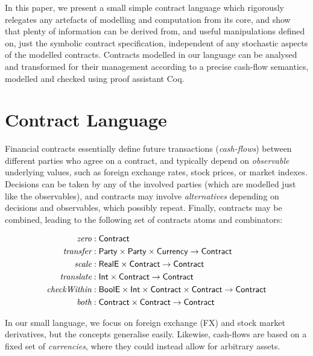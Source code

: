 \documentclass[a4paper,debug,twocolumn]{easychair}
\newcommand{\comm}[3][red]{{\small \color{#1}{$\spadesuit$#2: #3}}}
\newcommand{\jbcomment}[1]{\comm[orange]{jb}{#1}}
\newcommand\type[1]{\mathsf{#1}}
\theoremstyle{plain}
\begin{document}
In this paper, we present a small simple contract language which rigorously
relegates any artefacts of modelling and computation from its core, and show
that plenty of information can be derived from, and useful manipulations defined
on, just the symbolic contract specification, independent of any stochastic
aspects of the modelled contracts.
Contracts modelled in our language can be analysed and transformed for their
management according to a precise cash-flow semantics, modelled and checked
using proof assistant Coq.


\section{Contract Language}
\label{sec:contract-language}

Financial contracts essentially define future transactions (\emph{cash-flows})
between different parties who agree on a contract, and typically depend on
\emph{observable} underlying values, such as foreign exchange rates, stock
prices, or market indexes.
%
Decisions can be taken by any of the involved parties (which are modelled
just like the observables), and contracts may involve \emph{alternatives}
depending on decisions and observables, which possibly repeat.
Finally, contracts may be combined, leading to 
the following set of contracts atoms and combinators:

\vspace*{-3ex}
{\footnotesize

\begin{align*}
\emph{zero} &: \type{Contract}\\
\emph{transfer} &: \type{Party} \times \type{Party} \times \type{Currency}\to \type{Contract}\\
\emph{scale}&: \type{RealE} \times \type{Contract} \to \type{Contract}\\
\emph{translate}&: \type{Int} \times \type{Contract} \to \type{Contract}\\ 
\emph{checkWithin}&:  \type{BoolE} \times \type{Int} \times \type{Contract} \times \type{Contract} %
\to \type{Contract}\\
\emph{both}&: \type{Contract} \times \type{Contract} \to \type{Contract}
\end{align*}
\vspace*{-3ex}

}

In our small language, we focus on foreign exchange (FX) and stock market
derivatives, but the concepts generalise easily. Likewise, cash-flows are
based on a fixed set of \emph{currencies}, where they could instead allow for
arbitrary assets.
\end{document}
